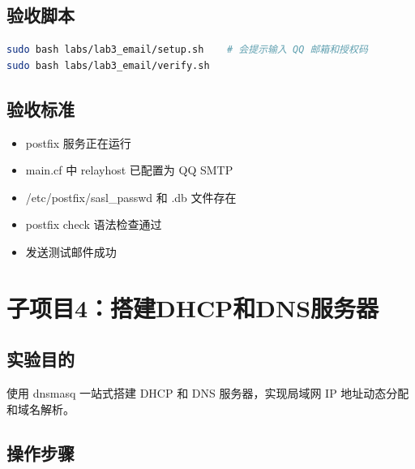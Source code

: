 \documentclass[12pt,a4paper]{ctexart}
\begin{document}
\subsection{验收脚本}

\begin{cmdbox}
\begin{lstlisting}[language=bash]
sudo bash labs/lab3_email/setup.sh    # 会提示输入 QQ 邮箱和授权码
sudo bash labs/lab3_email/verify.sh
\end{lstlisting}
\end{cmdbox}

\subsection{验收标准}

\begin{itemize}
  \item postfix 服务正在运行
  \item main.cf 中 relayhost 已配置为 QQ SMTP
  \item /etc/postfix/sasl\_passwd 和 .db 文件存在
  \item postfix check 语法检查通过
  \item 发送测试邮件成功
\end{itemize}

\newpage
\section{子项目4：搭建DHCP和DNS服务器}

\subsection{实验目的}

使用 dnsmasq 一站式搭建 DHCP 和 DNS 服务器，实现局域网 IP 地址动态分配和域名解析。

\subsection{操作步骤}
\end{document}
